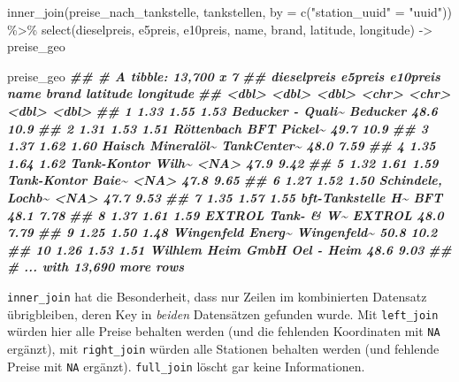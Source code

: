 \documentclass[
  ngerman,
]{article}
\newenvironment{Shaded}{\begin{snugshade}}{\end{snugshade}}
\newcommand{\AttributeTok}[1]{\textcolor[rgb]{0.77,0.63,0.00}{#1}}
\newcommand{\DocumentationTok}[1]{\textcolor[rgb]{0.56,0.35,0.01}{\textbf{\textit{#1}}}}
\newcommand{\FunctionTok}[1]{\textcolor[rgb]{0.00,0.00,0.00}{#1}}
\newcommand{\NormalTok}[1]{#1}
\newcommand{\OtherTok}[1]{\textcolor[rgb]{0.56,0.35,0.01}{#1}}
\newcommand{\SpecialCharTok}[1]{\textcolor[rgb]{0.00,0.00,0.00}{#1}}
\newcommand{\StringTok}[1]{\textcolor[rgb]{0.31,0.60,0.02}{#1}}
\begin{document}
\begin{Shaded}
\begin{Highlighting}[]
\FunctionTok{inner\_join}\NormalTok{(preise\_nach\_tankstelle, tankstellen,}
           \AttributeTok{by =} \FunctionTok{c}\NormalTok{(}\StringTok{"station\_uuid"} \OtherTok{=} \StringTok{"uuid"}\NormalTok{)) }\SpecialCharTok{\%\textgreater{}\%}
  \FunctionTok{select}\NormalTok{(dieselpreis, e5preis, e10preis, name, brand, latitude, longitude) }\OtherTok{{-}\textgreater{}}
\NormalTok{  preise\_geo}

\NormalTok{preise\_geo}
\DocumentationTok{\#\# \# A tibble: 13,700 x 7}
\DocumentationTok{\#\#    dieselpreis e5preis e10preis name              brand       latitude longitude}
\DocumentationTok{\#\#          \textless{}dbl\textgreater{}   \textless{}dbl\textgreater{}    \textless{}dbl\textgreater{} \textless{}chr\textgreater{}             \textless{}chr\textgreater{}          \textless{}dbl\textgreater{}     \textless{}dbl\textgreater{}}
\DocumentationTok{\#\#  1        1.33    1.55     1.53 Beducker {-} Quali\textasciitilde{} Beducker        48.6     10.9 }
\DocumentationTok{\#\#  2        1.31    1.53     1.51 Röttenbach        BFT Pickel\textasciitilde{}     49.7     10.9 }
\DocumentationTok{\#\#  3        1.37    1.62     1.60 Haisch Mineralöl\textasciitilde{} TankCenter\textasciitilde{}     48.0      7.59}
\DocumentationTok{\#\#  4        1.35    1.64     1.62 Tank{-}Kontor Wilh\textasciitilde{} \textless{}NA\textgreater{}            47.9      9.42}
\DocumentationTok{\#\#  5        1.32    1.61     1.59 Tank{-}Kontor Baie\textasciitilde{} \textless{}NA\textgreater{}            47.8      9.65}
\DocumentationTok{\#\#  6        1.27    1.52     1.50 Schindele, Lochb\textasciitilde{} \textless{}NA\textgreater{}            47.7      9.53}
\DocumentationTok{\#\#  7        1.35    1.57     1.55 bft{-}Tankstelle H\textasciitilde{} BFT             48.1      7.78}
\DocumentationTok{\#\#  8        1.37    1.61     1.59 EXTROL Tank{-} \& W\textasciitilde{} EXTROL          48.0      7.79}
\DocumentationTok{\#\#  9        1.25    1.50     1.48 Wingenfeld Energ\textasciitilde{} Wingenfeld\textasciitilde{}     50.8     10.2 }
\DocumentationTok{\#\# 10        1.26    1.53     1.51 Wilhlem Heim GmbH Oel {-} Heim      48.6      9.03}
\DocumentationTok{\#\# \# ... with 13,690 more rows}
\end{Highlighting}
\end{Shaded}

\texttt{inner\_join} hat die Besonderheit, dass nur Zeilen im kombinierten Datensatz übrigbleiben, deren Key in \emph{beiden} Datensätzen gefunden wurde. Mit \texttt{left\_join} würden hier alle Preise behalten werden (und die fehlenden Koordinaten mit \texttt{NA} ergänzt), mit \texttt{right\_join} würden alle Stationen behalten werden (und fehlende Preise mit \texttt{NA} ergänzt). \texttt{full\_join} löscht gar keine Informationen.
\end{document}
